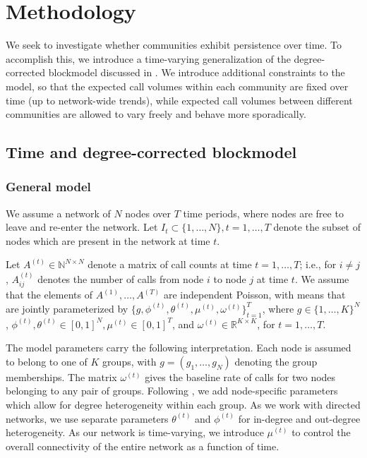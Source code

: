 \documentclass{article}
\begin{document}
\section{Methodology}

We seek to investigate whether communities exhibit persistence over time. To accomplish this, we introduce a time-varying generalization of the degree-corrected blockmodel discussed in \cite{karrer2011stochastic}. We introduce additional constraints to the model, so that the expected call volumes within each community are fixed over time (up to network-wide trends), while expected call volumes between different communities are allowed to vary freely and behave more sporadically. 

\subsection{Time and degree-corrected blockmodel}

\subsubsection{General model}
 We assume a network of $N$ nodes over $T$ time periods, where nodes are free to leave and re-enter the network. Let $I_t \subset \{1,\ldots,N\}, t=1,\ldots,T$ denote the subset of nodes which are present in the network at time $t$.

Let $A^{(t)} \in \mathbb{N}^{N \times N}$ denote a matrix of call counts at time $t=1,\ldots,T$; i.e., for $i \neq j$, $A_{ij}^{(t)}$ denotes the number of calls from node $i$ to node $j$ at time $t$. We assume that the elements of $A^{(1)},\ldots,A^{(T)}$ are independent Poisson, with means that are jointly parameterized  by $ \{g,\phi^{(t)},\theta^{(t)},\mu^{(t)},\omega^{(t)}\}_{t=1}^T$, where $g \in \{1,\ldots,K\}^N$, $\phi^{(t)}, \theta^{(t)} \in [0,1]^N, \mu^{(t)} \in [0,1]^T$, and  $\omega^{(t)} \in \mathbb{R}^{K \times K}$, for $t=1,\ldots,T$. 

The model parameters carry the following interpretation. Each node is assumed to belong to one of $K$ groups, with $g=(g_1,\ldots,g_N)$ denoting the group memberships. The matrix $\omega^{(t)}$ gives the baseline rate of calls for two nodes belonging to any pair of groups. Following \cite{karrer2011stochastic}, we add node-specific parameters which allow for degree heterogeneity within each group. As we work with directed networks, we use separate parameters $\theta^{(t)}$ and $\phi^{(t)}$ for in-degree and out-degree heterogeneity. As our network is time-varying, we introduce $\mu^{(t)}$ to control the overall connectivity of the entire network as a function of time. 
\end{document}
